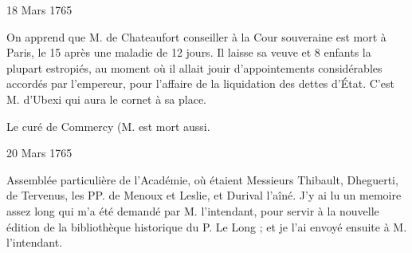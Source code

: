                     \begin{diary}{18 Mars 1765}{}

                         On apprend que M. de Chateaufort
                           conseiller
                           à la Cour souveraine est mort à Paris, le 15 après
                           une maladie de 12 jours. Il laisse sa veuve
                           et 8 enfants la plupart estropiés, au moment
                           où il allait jouir d'appointements considérables
                           accordés par l'empereur, pour l'affaire de la
                           liquidation des dettes d’État. C'est M.
                              d'Ubexi
                           qui aura le cornet à sa place. \bigskip



                           Le curé de Commercy (M.
                           est mort aussi. \bigskip


                     \end{diary}


                     \begin{diary}{20 Mars 1765}{}

                         Assemblée particulière de l'Académie, où
                           étaient Messieurs
                           Thibault, Dheguerti, de
                              Tervenus,
                           les PP. de Menoux et Leslie, et Durival l'aîné. J'y ai lu un
                           memoire assez long qui m'a
                           été demandé par M.
                              l'intendant, pour servir
                           à la nouvelle
                           édition de la bibliothèque
                           historique du P. Le Long ;
                           et je l'ai envoyé ensuite à M.
                              l'intendant. \bigskip



                     \end{diary}

